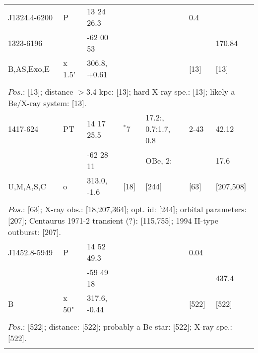 \documentclass{aa}
\begin{document}
\begin{table*}[h]
\begin{tabular}{p{2.5cm}p{1cm}p{1.8cm}p{2.3cm}p{3.3cm}p{2.0cm}p{2.2cm}}
\noalign{\smallskip}
\hline
\noalign{\smallskip}
J1324.4-6200 &   P     & 13 24 26.3 &          &                  &  0.4        &         \\         
1323-6196      &           & -62 00 53   &          &                  &                &  170.84 \\
B,AS,Exo,E   & x 1.5' & 306.8, +0.61 &          &                  &   [13]       &       [13] \\
\\
\multicolumn{7}{p{17.5cm}}{
$Pos$.: [13];  distance $>$3.4 kpc: [13]; hard X-ray spe.: [13]; likely a Be/X-ray system: [13].     }\\

\noalign{\smallskip}
\hline
\noalign{\smallskip}
1417-624    & PT       & 14 17 25.5       &  $^*$7           & 17.2:, 0.7:1.7, 0.8    & 2-43      & 42.12             \\
                     &             & -62 28 11          &                       & OBe, 2:                    &               & 17.6     \\
U,M,A,S,C  & o          & 313.0, -1.6       & [18]               &  [244]                        & [63]       & [207,508]    \\
\\
\multicolumn{7}{p{17.5cm}}{
$Pos$.: [63]; X-ray obs.: [18,207,364]; opt. id: [244]; orbital parameters: [207]; Centaurus 1971-2 transient (?): 
[115,755]; 1994 II-type outburst: [207].}\\

\noalign{\smallskip}
\hline
\noalign{\smallskip}
J1452.8-5949 &   P       &  14 52 49.3     &               &             &    0.04       &             \\         
                          &            & -59 49 18        &                &            &                     &    437.4  \\
B                       &  x 50" & 317.6, -0.44   &               &             &  [522]        &       [522] \\
  
\\
\multicolumn{7}{p{17.5cm}}{
$Pos$.: [522]; distance: [522]; probably a Be star: [522]; X-ray spe.: [522].       }\\

\noalign{\smallskip}
\hline
\end{tabular}
\end{table*}
\end{document}
